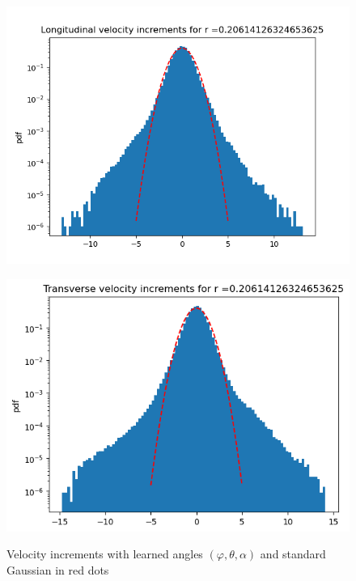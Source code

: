 \documentclass[a4paper,12pt]{article}
\theoremstyle{definition}
\begin{document}
\begin{figure}[H]
    \centering
    \begin{minipage}{0.49\textwidth}
        \centering
        \includegraphics[width=\linewidth]{illustrations/LongVelIncrAngles.png}
        \label{fig:VelIncrLongAngles}
    \end{minipage}\hfill
    \begin{minipage}{0.49\textwidth}
        \centering
        \includegraphics[width=\linewidth]{illustrations/TransVelIncrAngles.png}
        \label{fig:VelIncrTransAngles}
    \end{minipage}
    \caption{Velocity increments with learned angles \((\varphi,\theta,\alpha)\) and standard Gaussian in red dots}
\end{figure}
\end{document}
